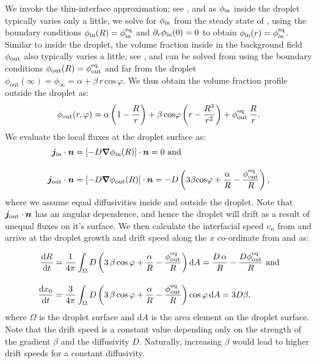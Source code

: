 We invoke the thin-interface approximation; see , and as $\phi_\mathrm{in}$ inside the droplet typically varies only a little, we solve for $\phi_\mathrm{in}$ from the steady state of , using the boundary conditions $\phi_\mathrm{in}(R) = \phi^\mathrm{eq}_\mathrm{in}$ and $\partial_r \phi_\mathrm{in} (0) = 0$ to obtain $\phi_\mathrm{in}(r) = \phi^\mathrm{eq}_\mathrm{in}$.
Similar to inside the droplet, the volume fraction inside in the background field $\phi_\mathrm{out}$ also typically varies a little; see , and can be solved from  using the boundary conditions $\phi_\mathrm{out}(R) = \phi^\mathrm{eq}_\mathrm{out}$ and far from the droplet $\phi_\mathrm{out}(\infty) = \phi_{\infty} = \alpha + \beta \, r \, \text{cos}\,\varphi$.
We thus obtain the volume fraction profile outside the droplet as:
\begin{equation*}
    \phi_\mathrm{out}(r, \varphi) = \alpha \left ( 1 - \frac{R}{r} \right ) + \beta \, \text{cos} \varphi \left ( r - \frac{R^3}{r^2} \right ) + \phi^\mathrm{eq}_\mathrm{out}\,\frac{R}{r}.
\end{equation*}
We evaluate the local fluxes at the droplet surface as:
\begin{subequations}
\begin{align}
    \boldsymbol{j}_\mathrm{in} \cdot \boldsymbol{n} &= [-D {\boldsymbol{\nabla}} \phi_\mathrm{in} (R)] \cdot \boldsymbol{n} = 0 \mathrm{~and~} \nonumber
    \\[10pt]
    \boldsymbol{j}_\mathrm{out} \cdot \boldsymbol{n} &= [-D {\boldsymbol{\nabla}} \phi_\mathrm{out} (R)] \cdot \boldsymbol{n} = -D \left ( 3 \beta \text{cos} \varphi  + \frac{\alpha}{R} - \frac{\phi^\mathrm{eq}_\mathrm{out}}{R} \right ), \nonumber
\end{align}
\end{subequations}
where we assume equal diffusivities inside and outside the droplet.
Note that $\boldsymbol{j}_\mathrm{out} \cdot \boldsymbol{n}$ has an angular dependence, and hence the droplet will drift as a result of unequal fluxes on it's surface.
We then calculate the interfacial speed $v_n$ from  and arrive at the droplet growth and drift speed along the $x$ co-ordinate from  and  as:

\begin{subequations}
\label{eqn:interfacefluxes_gradient}
\begin{align}
	\frac{\mathrm{d} R}{\mathrm{d} t} &= \frac{1}{4 \pi} \int_{\Omega} D \left ( 3\,\beta \, \text{cos} \, \varphi  + \frac{\alpha}{R} - \frac{\phi^\mathrm{eq}_\mathrm{out}}{R} \right ) \mathrm{d}A = \frac{D\,\alpha}{R} - \frac{D \phi^\mathrm{eq}_\mathrm{out} }{R}
	\text{~and}
\\[10pt]
    \frac{\mathrm{d} x_0}{\mathrm{d} t} &= \frac{3}{4 \pi} \int_{\Omega} D \left ( 3\,\beta \, \text{cos} \, \varphi  + \frac{\alpha}{R} - \frac{\phi^\mathrm{eq}_\mathrm{out}}{R} \right ) \text{cos} \, \varphi \, \mathrm{d}A = 3 D \beta,
\end{align}
\end{subequations}
where $\Omega$ is the droplet surface and $\mathrm{d} A$ is the area element on the droplet surface. 
Note that the drift speed is a constant value depending only on the strength of the gradient $\beta$ and the diffusivity $D$.
Naturally, increasing $\beta$ would lead to higher drift speeds for a constant diffusivity.

